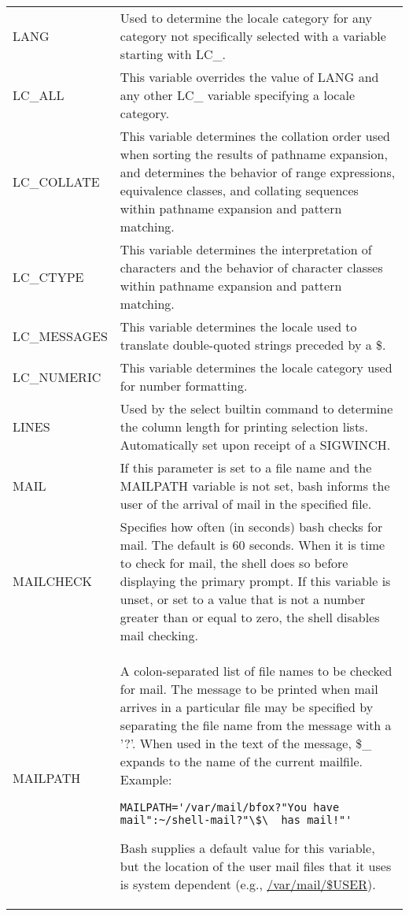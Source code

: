 \documentclass[11pt]{article}
\begin{document}
\begin{longtable}{p{}p{}}
LANG &
Used to determine the locale category for any category not specifically selected with a variable starting with LC\_. \\

LC\_ALL &

This variable overrides the value of LANG and any other LC\_ variable specifying a locale category. \\

LC\_COLLATE &
This variable determines the collation order used when sorting the results of pathname expansion, and determines the behavior of range expressions, equivalence classes, and collating sequences within pathname expansion and pattern matching. \\

LC\_CTYPE &
This variable determines the interpretation of characters and the behavior of character classes within pathname expansion and pattern matching. \\

LC\_MESSAGES &
This variable determines the locale used to translate double-quoted strings preceded by a \$. \\

LC\_NUMERIC &
This variable determines the locale category used for number formatting. \\

LINES &
Used by the select builtin command to determine the column length for printing selection lists. Automatically set upon receipt of a SIGWINCH. \\

MAIL &
If this parameter is set to a file name and the MAILPATH variable is not set, bash informs the user of the arrival of mail in the specified file. \\

MAILCHECK &
Specifies how often (in seconds) bash checks for mail. The default is 60 seconds. When it is time to check for mail, the shell does so before displaying the primary prompt. If this variable is unset, or set to a value that is not a number greater than or equal to zero, the shell disables mail checking. \\

MAILPATH &
A colon-separated list of file names to be checked for mail. The message to be printed when mail arrives in a particular file may be specified by separating the file name from the message with a '?'. When used in the text of the message, \$\_ expands to the name of the current mailfile. Example:
\begin{lstlisting}
MAILPATH='/var/mail/bfox?"You have mail":~/shell-mail?"\$\_ has mail!"'
\end{lstlisting}
Bash supplies a default value for this variable, but the location of the user mail files that it uses is system dependent (e.g., \url{/var/mail/\$USER}). \\


\end{longtable}
\end{document}

